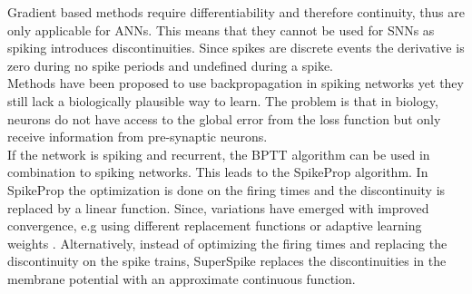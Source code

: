 	Gradient based methods require differentiability and therefore continuity, thus are only applicable for \acp{ANN}. This means that they cannot be used for \acp{SNN} as spiking introduces discontinuities. Since spikes are discrete events the derivative is zero during no spike periods and undefined during a spike.\\
	Methods have been proposed to use backpropagation in spiking networks\cite{lee_training_2016} yet they still lack a biologically plausible way to learn. The problem is that in biology, neurons do not have access to the global error from the loss function but only receive information from pre-synaptic neurons.\\
	If the network is spiking and recurrent, the \ac{BPTT} algorithm can be used in combination to spiking networks. This leads to the SpikeProp\cite{bohte_spikeprop_2000} algorithm. In SpikeProp the optimization is done on the firing times and the discontinuity is replaced by a linear function. Since, variations have emerged with improved convergence\cite{mckennoch_fast_2006}, e.g using different replacement functions \cite{thiruvarudchelvan_analysis_2013,neftci_surrogate_2019} or adaptive learning weights \cite{shrestha_adaptive_2015}.
	Alternatively, instead of optimizing the firing times and replacing the discontinuity on the spike trains, SuperSpike\cite{zenke_superspike_2018} replaces the discontinuities in the membrane potential with an approximate continuous function.\\
